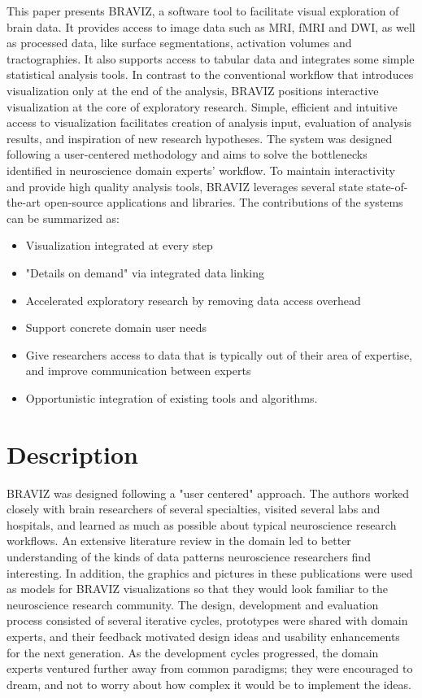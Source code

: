 \documentclass[utf8]{frontiersSCNS} %
\begin{document}
This paper presents BRAVIZ, a software tool to facilitate visual exploration of brain data. It provides access to image data such as MRI, fMRI and DWI, as well as processed data, like surface segmentations, activation volumes and tractographies. It also supports access to tabular data and integrates some simple statistical analysis tools. In contrast to the conventional workflow that introduces visualization only at the end of the analysis, BRAVIZ positions interactive visualization at the core of exploratory research. Simple, efficient and intuitive access to visualization facilitates creation of analysis input, evaluation of analysis results, and inspiration of new research hypotheses. The system was designed following a user-centered methodology and aims to solve the bottlenecks identified in neuroscience domain experts’ workflow. To maintain interactivity and provide high quality analysis tools, BRAVIZ leverages several state state-of-the-art open-source applications and libraries.  The contributions of the systems can be summarized as:
\begin{itemize}
\item Visualization integrated at every step
\item "Details on demand" via integrated data linking 
\item Accelerated exploratory research by removing data access overhead
\item Support concrete domain user needs
\item Give researchers access to data that is typically out of their area of expertise, and improve communication between experts
\item Opportunistic integration of existing tools and algorithms.

\end{itemize}

\section{Description}

BRAVIZ was designed following a "user centered" approach\citep{fernandez_user-centered_2013,wassink_applying_2009}. The authors worked closely with brain researchers of several specialties, visited several labs and hospitals, and learned as much as possible about typical neuroscience research workflows. An extensive literature review in the domain led to better understanding of the kinds of data patterns neuroscience researchers find interesting. In addition, the graphics and pictures in these publications were used as models for BRAVIZ visualizations so that they would look familiar to the neuroscience research community. The design, development and evaluation process consisted of several iterative cycles, prototypes were shared with domain experts, and their feedback motivated design ideas and usability enhancements for the next generation. As the development cycles progressed, the domain experts ventured further away from common paradigms; they were encouraged to dream, and not to worry about how complex it would be to implement the ideas. 
\end{document}
